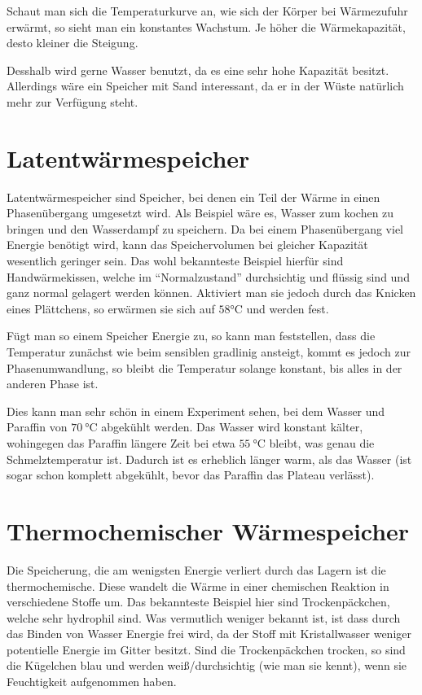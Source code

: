 \documentclass[12pt,a4paper,titlepage,headinclude,bibtotoc]{scrartcl}
\begin{document}
Schaut man sich die Temperaturkurve an, wie sich der Körper bei Wärmezufuhr erwärmt, so sieht man ein konstantes Wachstum.
Je höher die Wärmekapazität, desto kleiner die Steigung.

Desshalb wird gerne Wasser benutzt, da es eine sehr hohe Kapazität besitzt.
Allerdings wäre ein Speicher mit Sand interessant, da er in der Wüste natürlich mehr zur Verfügung steht.





\section{Latentwärmespeicher}
Latentwärmespeicher sind Speicher, bei denen ein Teil der Wärme in einen Phasenübergang umgesetzt wird.
Als Beispiel wäre es, Wasser zum kochen zu bringen und den Wasserdampf zu speichern.
Da bei einem Phasenübergang viel Energie benötigt wird, kann das Speichervolumen bei gleicher Kapazität wesentlich geringer sein.
Das wohl bekannteste Beispiel hierfür sind Handwärmekissen, welche im "`Normalzustand"' durchsichtig und flüssig sind und ganz normal gelagert werden können.
Aktiviert man sie jedoch durch das Knicken eines Plättchens, so erwärmen sie sich auf $58\si\celsius$ und werden fest.

Fügt man so einem Speicher Energie zu, so kann man feststellen, dass die Temperatur zunächst wie beim sensiblen gradlinig ansteigt, kommt es jedoch zur Phasenumwandlung, so bleibt die Temperatur solange konstant, bis alles in der anderen Phase ist.

Dies kann man sehr schön in einem Experiment sehen, bei dem Wasser und Paraffin von $\SI{70}\celsius$ abgekühlt werden.
Das Wasser wird konstant kälter, wohingegen das Paraffin längere Zeit bei etwa $\SI{55}\celsius$ bleibt, was genau die Schmelztemperatur ist.
Dadurch ist es erheblich länger warm, als das Wasser (ist sogar schon komplett abgekühlt, bevor das Paraffin das Plateau verlässt).




\section{Thermochemischer Wärmespeicher}
Die Speicherung, die am wenigsten Energie verliert durch das Lagern ist die thermochemische.
Diese wandelt die Wärme in einer chemischen Reaktion in verschiedene Stoffe um.
Das bekannteste Beispiel hier sind Trockenpäckchen, welche sehr hydrophil sind.
Was vermutlich weniger bekannt ist, ist dass durch das Binden von Wasser Energie frei wird, da der Stoff mit Kristallwasser weniger potentielle Energie im Gitter besitzt.
Sind die Trockenpäckchen trocken, so sind die Kügelchen blau und werden weiß/durchsichtig (wie man sie kennt), wenn sie Feuchtigkeit aufgenommen haben.
\end{document}

